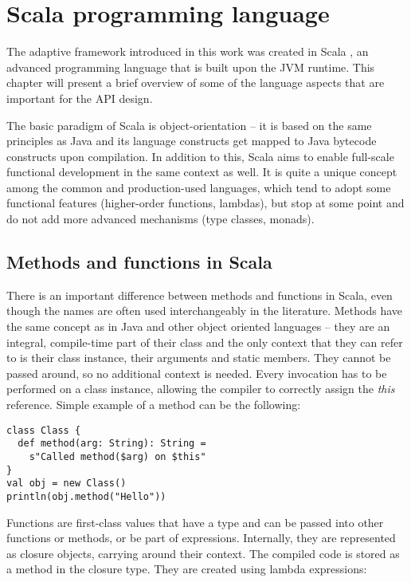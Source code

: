\chapter{Scala programming language}
\label{chap:scala}

The adaptive framework introduced in this work was created in Scala \cite{noauthor_scala_nodate}, an advanced programming language that is built upon the JVM runtime. This chapter will present a brief overview of some of the language aspects that are important for the API design.

The basic paradigm of Scala is object-orientation -- it is based on the same principles as Java and its language constructs get mapped to Java bytecode constructs upon compilation. In addition to this, Scala aims to enable full-scale functional development in the same context as well. It is quite a unique concept among the common and production-used languages, which tend to adopt some functional features (higher-order functions, lambdas), but stop at some point and do not add more advanced mechanisms (type classes, monads).

\section{Methods and functions in Scala}
\label{sec:metandfun}

There is an important difference between methods and functions in Scala, even though the names are often used interchangeably in the literature. Methods have the same concept as in Java and other object oriented languages -- they are an integral, compile-time part of their class and the only context that they can refer to is their class instance, their arguments and static members. They cannot be passed around, so no additional context is needed. Every invocation has to be performed on a class instance, allowing the compiler to correctly assign the \textit{this} reference. Simple example of a method can be the following:

\lstset{style=Scala}
\begin{lstlisting}
class Class {
  def method(arg: String): String = 
    s"Called method($arg) on $this"
}
val obj = new Class()
println(obj.method("Hello"))
\end{lstlisting}

Functions are first-class values that have a type and can be passed into other functions or methods, or be part of expressions. Internally, they are represented as closure objects, carrying around their context. The compiled code is stored as a method in the closure type. They are created using lambda expressions:

